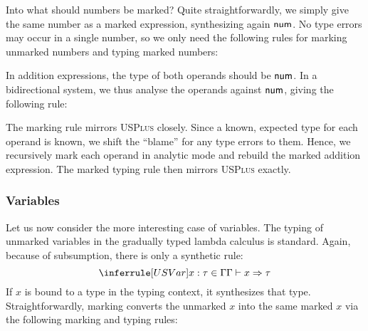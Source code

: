 Into what should numbers be marked? Quite straightforwardly, we simply give the same number as a
marked expression, synthesizing again $\TNum$. No type errors may occur in a single number, so we
only need the following rules for marking unmarked numbers and typing marked numbers:
%
\begin{mathpar}

\end{mathpar}

In addition expressions, the type of both operands should be $\TNum$. In a bidirectional system, we
thus analyse the operands against $\TNum$, giving the following rule:
%
\begin{mathpar}
\end{mathpar}

The marking rule mirrors \textsc{USPlus} closely. Since a known, expected type for each operand is
known, we shift the ``blame'' for any type errors to them. Hence, we recursively mark each operand
in analytic mode and rebuild the marked addition expression. The marked typing rule then mirrors
\textsc{USPlus} exactly.
%
\begin{mathpar}

\end{mathpar}

\subsubsection{Variables}
\label{sec:calculus-variables}

Let us now consider the more interesting case of variables. The typing of unmarked variables in the
gradually typed lambda calculus is standard. Again, because of subsumption, there is only a
synthetic rule:
\[%
  \judgment{
    \inCtx{\ctx}{x}{\TMV}
  }{
    \ctxSynType{\ctx}{x}{\TMV}
  }{USVar}
\]%
If $x$ is bound to a type in the typing context, it synthesizes that type. Straightforwardly,
marking converts the unmarked $x$ into the same marked $x$ via the following marking and typing
rules:
%
\begin{mathpar}

\end{mathpar}

